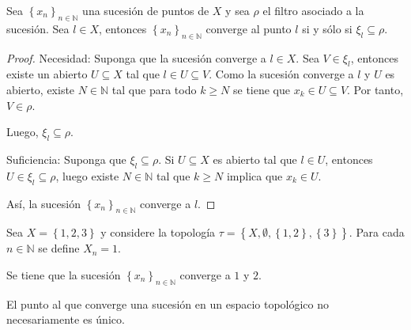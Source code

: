 \documentclass[12pt]{report}
\theoremstyle{largebreak}
\begin{document}
    \begin{propo}
        Sea $\left\{x_n \right\}_{ n\in\mathbb{N}}$ una sucesión de puntos de $X$ y sea $\rho$ el filtro asociado a la sucesión. Sea $l\in X$, entonces $\left\{x_n \right\}_{ n\in\mathbb{N}}$ converge al punto $l$ si y sólo si $\xi_l\subseteq \rho$.        
    \end{propo}

    \begin{proof}
        Necesidad: Suponga que la sucesión converge a $l\in X$. Sea $V\in\xi_l$, entonces existe un abierto $U\subseteq X$ tal que $l\in U\subseteq V$. Como la sucesión converge a $l$ y $U$ es abierto, existe $N\in\mathbb{N}$ tal que para todo $k\geq N$ se tiene que $x_k\in U\subseteq V$. Por tanto, $V\in\rho$.

        Luego, $\xi_l\subseteq\rho$.

        Suficiencia: Suponga que $\xi_l\subseteq\rho$. Si $U\subseteq X$ es abierto tal que $l\in U$, entonces $U\in\xi_l\subseteq \rho$, luego existe $N\in\mathbb{N}$ tal que $k\geq N$ implica que $x_k\in U$.

        Así, la sucesión $\left\{x_n \right\}_{ n\in\mathbb{N}}$ converge a $l$.
    \end{proof}

    \begin{exa}
        Sea $X=\left\{1,2,3 \right\}$ y considere la topología $\tau=\left\{X,\emptyset,\left\{1,2 \right\},\left\{3\right\} \right\}$. Para cada $n\in\mathbb{N}$ se define $X_n=1$.

        Se tiene que la sucesión $\left\{x_n\right\}_{ n\in\mathbb{N}}$ converge a $1$ y $2$.
    \end{exa}

    \begin{obs}
        El punto al que converge una sucesión en un espacio topológico no necesariamente es único.
    \end{obs}
\end{document}
